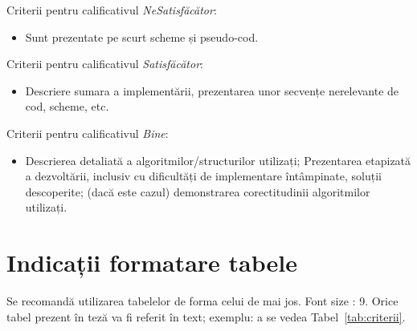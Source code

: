 \documentclass[12pt,a4paper]{report}
\begin{document}
Criterii pentru calificativul \textit{Ne\textit{Satisfăcător}}:
\begin{itemize}
	\item	Sunt prezentate pe scurt scheme și pseudo-cod.
\end{itemize}
Criterii pentru calificativul \textit{Satisfăcător}:
\begin{itemize}
	\item	Descriere sumara a implementării, prezentarea unor secvențe nerelevante de cod, scheme, etc.
\end{itemize}
Criterii pentru calificativul \textit{Bine}:
\begin{itemize}
	\item	Descrierea detaliată a algoritmilor/structurilor utilizați; Prezentarea etapizată a dezvoltării, inclusiv cu dificultăți de implementare întâmpinate, soluții descoperite; (dacă este cazul) demonstrarea corectitudinii algoritmilor utilizați.
\end{itemize}

\section{Indicații formatare tabele}
Se recomandă utilizarea tabelelor de forma celui de mai jos.  Font size :  9.
Orice tabel prezent în teză va fi referit în text; exemplu: a se vedea Tabel~\ref{tab:criterii}.
\end{document}
